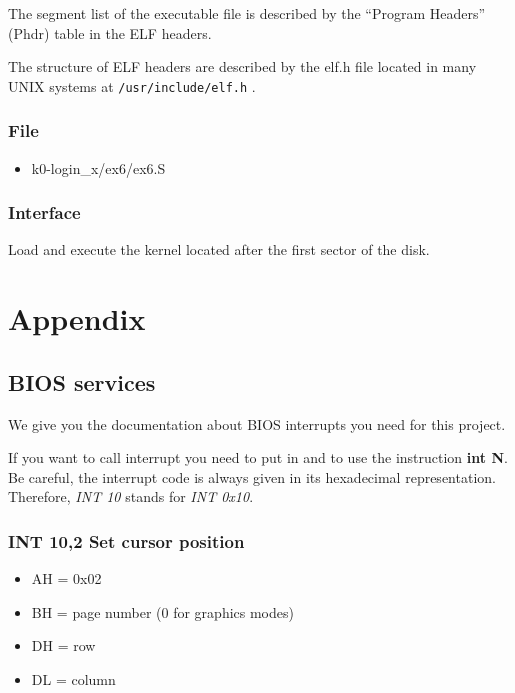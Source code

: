 The segment list of the executable file is described by the ``Program Headers''
(Phdr) table in the ELF headers.

The structure of ELF headers are described by the elf.h file located in many
UNIX systems at \verb+/usr/include/elf.h+  .

\subsection*{File}
\begin{itemize}
  \item k0-login\_x/ex6/ex6.S
\end{itemize}

\subsection*{Interface}
{
  Load and execute the kernel located after the first sector of the disk.
}

%
%

\chapter{Appendix}

%
%

\section{BIOS services}

We give you the documentation about BIOS interrupts you need for this
project.

If you want to call interrupt  you need to put  in
 and to use the instruction \textbf{int N}. Be careful, the
interrupt code is always given in its hexadecimal representation. Therefore,
\emph{INT 10} stands for \emph{INT 0x10}.

%
%
\subsection{INT 10,2 Set cursor position}
\begin{itemize}
  \item{AH = 0x02}
  \item{BH = page number (0 for graphics modes)}
  \item{DH = row}
  \item{DL = column}
\end{itemize}


